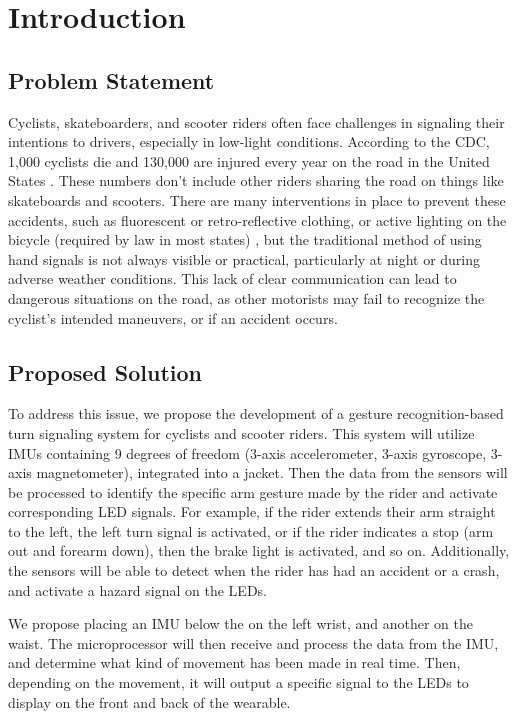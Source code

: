 \section{Introduction}
\subsection{Problem Statement}
Cyclists, skateboarders, and scooter riders often face challenges in signaling their intentions to drivers, especially in low-light conditions. According to the CDC, 1,000 cyclists die and 130,000 are injured every year on the road in the United States \cite{CDC2024BicycleSafety}. These numbers don’t include other riders sharing the road on things like skateboards and scooters. There are many interventions in place to prevent these accidents, such as fluorescent or retro-reflective clothing, or active lighting on the bicycle (required by law in most states) \cite{CDC2024BicycleSafety}, but the traditional method of using hand signals is not always visible or practical, particularly at night or during adverse weather conditions. This lack of clear communication can lead to dangerous situations on the road, as other motorists may fail to recognize the cyclist's intended maneuvers, or if an accident occurs. 

\subsection{Proposed Solution}
To address this issue, we propose the development of a gesture recognition-based turn signaling system for cyclists and scooter riders. This system will utilize IMUs containing 9 degrees of freedom (3-axis accelerometer, 3-axis gyroscope, 3-axis magnetometer), integrated into a jacket. Then the data from the sensors will be processed to identify the specific arm gesture made by the rider and activate corresponding LED signals. For example, if the rider extends their arm straight to the left, the left turn signal is activated, or if the rider indicates a stop (arm out and forearm down), then the brake light is activated, and so on. Additionally, the sensors will be able to detect when the rider has had an accident or a crash, and activate a hazard signal on the LEDs.

We propose placing an IMU below the on the left wrist, and another on the waist. The microprocessor will then receive and process the data from the IMU, and determine what kind of movement has been made in real time. Then, depending on the movement, it will output a specific signal to the LEDs to display on the front and back of the wearable.

